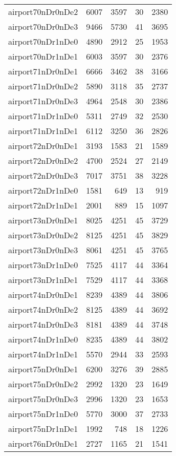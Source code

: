 \documentclass[../../../thesis.tex]{subfiles}
\begin{document}
\begin{longtable}{lrrrr}
airport70nDr0nDe2 & 6007 & 3597 & 30 & 2380 \\
airport70nDr0nDe3 & 9466 & 5730 & 41 & 3695 \\
airport70nDr1nDe0 & 4890 & 2912 & 25 & 1953 \\
airport70nDr1nDe1 & 6003 & 3597 & 30 & 2376 \\
airport71nDr0nDe1 & 6666 & 3462 & 38 & 3166 \\
airport71nDr0nDe2 & 5890 & 3118 & 35 & 2737 \\
airport71nDr0nDe3 & 4964 & 2548 & 30 & 2386 \\
airport71nDr1nDe0 & 5311 & 2749 & 32 & 2530 \\
airport71nDr1nDe1 & 6112 & 3250 & 36 & 2826 \\
airport72nDr0nDe1 & 3193 & 1583 & 21 & 1589 \\
airport72nDr0nDe2 & 4700 & 2524 & 27 & 2149 \\
airport72nDr0nDe3 & 7017 & 3751 & 38 & 3228 \\
airport72nDr1nDe0 & 1581 & 649 & 13 & 919 \\
airport72nDr1nDe1 & 2001 & 889 & 15 & 1097 \\
airport73nDr0nDe1 & 8025 & 4251 & 45 & 3729 \\
airport73nDr0nDe2 & 8125 & 4251 & 45 & 3829 \\
airport73nDr0nDe3 & 8061 & 4251 & 45 & 3765 \\
airport73nDr1nDe0 & 7525 & 4117 & 44 & 3364 \\
airport73nDr1nDe1 & 7529 & 4117 & 44 & 3368 \\
airport74nDr0nDe1 & 8239 & 4389 & 44 & 3806 \\
airport74nDr0nDe2 & 8125 & 4389 & 44 & 3692 \\
airport74nDr0nDe3 & 8181 & 4389 & 44 & 3748 \\
airport74nDr1nDe0 & 8235 & 4389 & 44 & 3802 \\
airport74nDr1nDe1 & 5570 & 2944 & 33 & 2593 \\
airport75nDr0nDe1 & 6200 & 3276 & 39 & 2885 \\
airport75nDr0nDe2 & 2992 & 1320 & 23 & 1649 \\
airport75nDr0nDe3 & 2996 & 1320 & 23 & 1653 \\
airport75nDr1nDe0 & 5770 & 3000 & 37 & 2733 \\
airport75nDr1nDe1 & 1992 & 748 & 18 & 1226 \\
airport76nDr0nDe1 & 2727 & 1165 & 21 & 1541 \\

\end{longtable}
\end{document}
